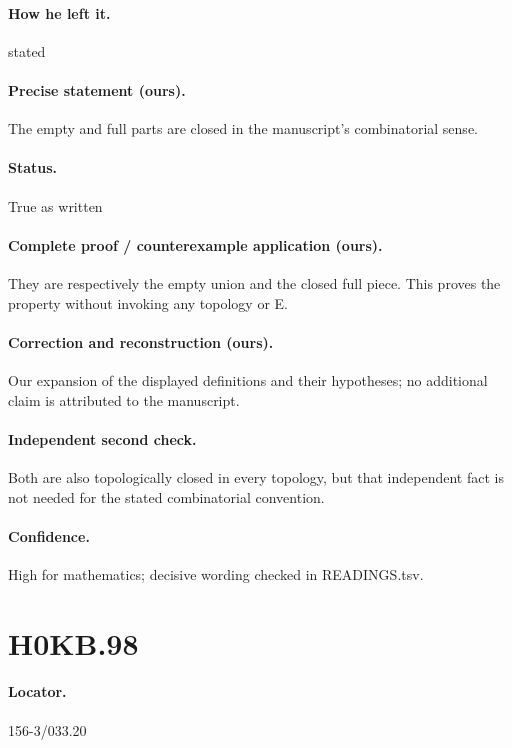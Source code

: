 \paragraph{How he left it.} stated

\paragraph{Precise statement (ours).} The empty and full parts are closed in the manuscript’s combinatorial sense.

\paragraph{Status.} True as written

\paragraph{Complete proof / counterexample application (ours).} They are respectively the empty union and the closed full piece. This proves the property without invoking any topology or E.

\paragraph{Correction and reconstruction (ours).} Our expansion of the displayed definitions and their hypotheses; no additional claim is attributed to the manuscript.

\paragraph{Independent second check.} Both are also topologically closed in every topology, but that independent fact is not needed for the stated combinatorial convention.

\paragraph{Confidence.} High for mathematics; decisive wording checked in READINGS.tsv.

\section*{H0KB.98}\label{statement:H0KB.98}
\paragraph{Locator.} 156-3/033.20

